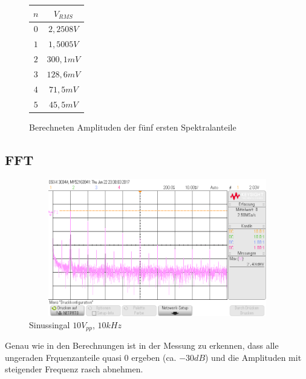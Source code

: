 \begin{figure}[H]
  \begin{center}
    \begin{tabular}{|c|c|} \hline
    $n$ & $V_{RMS}$ \\ \hline
    $0$ & $2,2508V$ \\ \hline
    $1$ & $1,5005V$ \\ \hline
    $2$ & $300,1mV$ \\ \hline
    $3$ & $128,6mV$ \\ \hline
    $4$ & $71,5mV$ \\ \hline
    $5$ & $45,5mV$ \\ \hline
    \end{tabular}
  \end{center}
  \caption{Berechneten Amplituden der f\"unf ersten Spektralanteile} \label{bsp4_SpecCalc}
\end{figure}



\subsection{FFT}
\begin{figure}[H]
 \begin{center}
  \includegraphics[height=6cm,width=12cm]{OsziBilder/bsp4_sin_fft_10Vpp_dB.png}
 \end{center}
 \caption{Sinussingal $10V_{pp}$, $10kHz$}\label{bsp4_fft}
\end{figure}
\noindent
Genau wie in den Berechnungen ist in der Messung zu erkennen, dass alle ungeraden Frquenzanteile quasi 0 ergeben (ca. $-30dB$) und die Amplituden mit steigender Frequenz rasch abnehmen.

